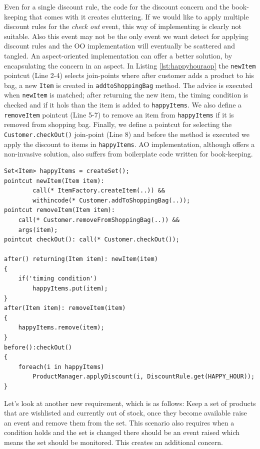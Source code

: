 Even for a single discount rule, the code for the discount concern and the book-keeping that comes with it creates cluttering. If we would like to apply multiple discount rules for the \emph{check out} event, this way of implementing is clearly not suitable. Also this event may not be the only event we want detect for applying discount rules and the OO implementation will eventually be scattered and tangled. An aspect-oriented implementation can offer a better solution, by encapsulating the concern in an aspect. In Listing \ref{lst:happyhouraop} the \texttt{newItem} pointcut (Line 2-4) selects join-points where after customer adds a product to his bag, a new \texttt{Item} is created in \texttt{addtoShoppingBag} method. The advice is executed when \texttt{newItem} is matched; after returning the new item, the timing condition is checked and if it hols than the item is added to \texttt{happyItems}. We also define a \texttt{removeItem} pointcut (Line 5-7)  to remove an item from \texttt{happyItems} if it is removed from shopping bag. Finally, we define a pointcut for selecting the \texttt{Customer.checkOut()} join-point (Line 8) and before the method is executed we apply the discount to items in \texttt{happyItems}. AO implementation, although offers a non-invasive solution, also suffers from boilerplate code written for book-keeping. 

\begin{lstlisting}[float, caption={An Aspectj implementation of Happy-hour discount rule}, label={lst:happyhouraop}]
Set<Item> happyItems = createSet();
pointcut newItem(Item item): 
		call(* ItemFactory.createItem(..)) && 
		withincode(* Customer.addToShoppingBag(..));
pointcut removeItem(Item item): 
	call(* Customer.removeFromShoppingBag(..)) && 
	args(item);
pointcut checkOut(): call(* Customer.checkOut());

after() returning(Item item): newItem(item)
{
	if('timing condition')
		happyItems.put(item);
}
after(Item item): removeItem(item)
{
	happyItems.remove(item);
}
before():checkOut()
{
	foreach(i in happyItems)
		ProductManager.applyDiscount(i, DiscountRule.get(HAPPY_HOUR));
}
\end{lstlisting}

Let's look at another new requirement, which is as follows: \textsf{Keep a set of products that are wishlisted and currently out of stock,  once they become available raise an event and remove them from the set}. This scenario also requires when a condition holds and the set is changed there should be an event raised which means the set should be monitored. This creates an additional concern. 

